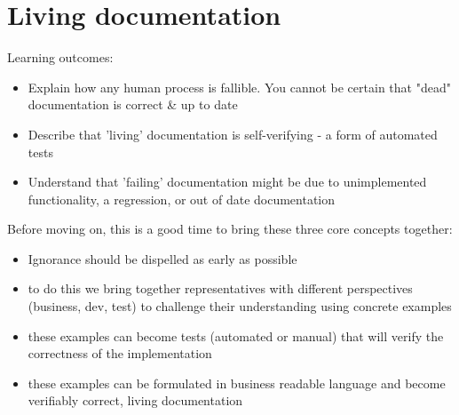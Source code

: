 \chapter*{Living documentation}

\ifnotes
    Learning outcomes:
    
    \begin{itemize}
        \item Explain how any human process is fallible. You cannot be certain that "dead" documentation is correct \& up to date
        \item Describe that 'living' documentation is self-verifying - a form of automated tests
        \item Understand that 'failing' documentation might be due to unimplemented functionality, a regression, or out of date documentation
    \end{itemize}
    
    Before moving on, this is a good time to bring these three core concepts together: 
    
    \begin{itemize}
        \item Ignorance should be dispelled as early as possible
        \item to do this we bring together representatives with different perspectives (business, dev, test) to challenge their understanding using concrete examples
        \item these examples can become tests (automated or manual) that will verify the correctness of the implementation
        \item these examples can be formulated in business readable language and become verifiably correct, living documentation
    \end{itemize}
\fi

\ifcontent
    
    
    
\fi